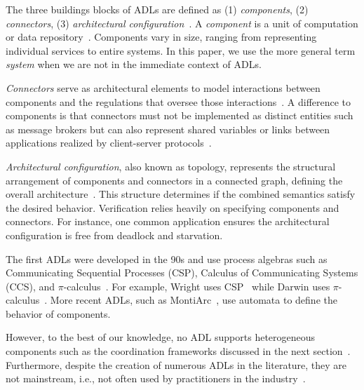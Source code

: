 \documentclass[runningheads]{llncs}
\begin{document}
The three buildings blocks of ADLs are defined as (1) \textit{components}, (2) \textit{connectors}, (3) \textit{architectural configuration}~\cite{medvidovicClassificationComparisonFramework2000,medvidovicFrameworkClassifyingComparing1997}.
A \textit{component} is a unit of computation or data repository~\cite{medvidovicClassificationComparisonFramework2000}.
Components vary in size, ranging from representing individual services to entire systems.
In this paper, we use the more general term \textit{system} when we are not in the immediate context of ADLs.

\textit{Connectors} serve as architectural elements to model interactions between components and the regulations that oversee those interactions~\cite{medvidovicClassificationComparisonFramework2000}.
A difference to components is that connectors must not be implemented as distinct entities such as message brokers but can also represent shared variables or links between applications realized by client-server protocols~\cite{medvidovicClassificationComparisonFramework2000}.

\textit{Architectural configuration}, also known as topology, represents the structural arrangement of components and connectors in a connected graph, defining the overall architecture~\cite{medvidovicClassificationComparisonFramework2000}.
This structure determines if the combined semantics satisfy the desired behavior.
Verification relies heavily on specifying components and connectors.
For instance, one common application ensures the architectural configuration is free from deadlock and starvation.

The first ADLs were developed in the 90s and use process algebras such as Communicating Sequential Processes (CSP), Calculus of Communicating Systems (CCS), and $\pi$-calculus~\cite{ozkayaAreWeThere2013}.
For example, Wright uses CSP~\cite{allenFormalBasisArchitectural1997} while Darwin uses $\pi$-calculus~\cite{mageeSpecifyingDistributedSoftware1995}.
More recent ADLs, such as MontiArc~\cite{haberMontiArcArchitecturalModeling2014}, use automata to define the behavior of components.

However, to the best of our knowledge, no ADL supports heterogeneous components such as the coordination frameworks discussed in the next section~\cite{medvidovicClassificationComparisonFramework2000}.
Furthermore, despite the creation of numerous ADLs in the literature, they are not mainstream, i.e., not often used by practitioners in the industry~\cite{clementsSurveyArchitectureDescription1996,woodsArchitectureDescriptionLanguages2005,pandeyArchitecturalDescriptionLanguages2010,ozkayaAreWeThere2013,medvidovicMovingArchitecturalDescription2006}.
\end{document}
